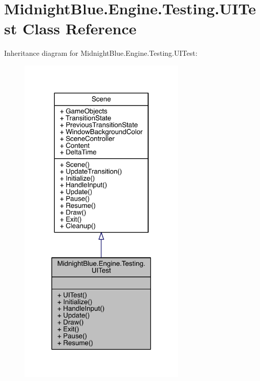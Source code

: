 \hypertarget{class_midnight_blue_1_1_engine_1_1_testing_1_1_u_i_test}{}\section{Midnight\+Blue.\+Engine.\+Testing.\+U\+I\+Test Class Reference}
\label{class_midnight_blue_1_1_engine_1_1_testing_1_1_u_i_test}


Inheritance diagram for Midnight\+Blue.\+Engine.\+Testing.\+U\+I\+Test\+:
\nopagebreak
\begin{figure}[H]
\begin{center}
\leavevmode
\includegraphics[width=225pt]{class_midnight_blue_1_1_engine_1_1_testing_1_1_u_i_test__inherit__graph}
\end{center}
\end{figure}



